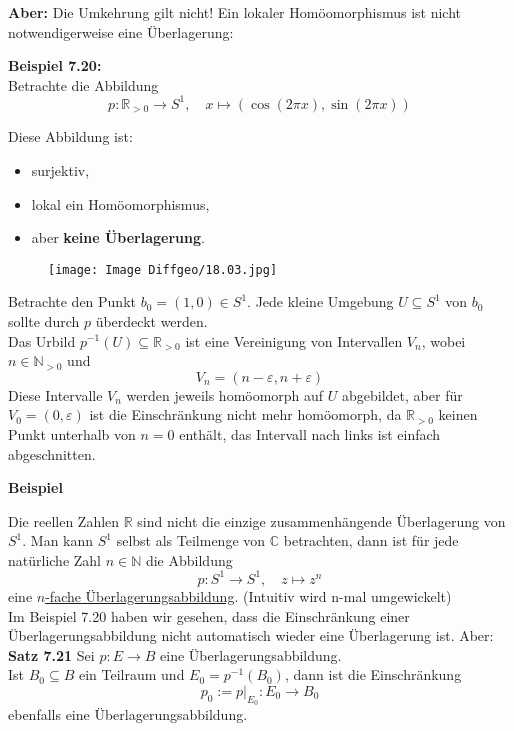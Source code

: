 \documentclass[fleqn, 12pt, letterpaper]{article}
\begin{document}
\textbf{Aber:} Die Umkehrung gilt nicht! Ein lokaler Homöomorphismus ist nicht notwendigerweise eine Überlagerung:

\vspace{1em}
\textbf{Beispiel 7.20:} \\
Betrachte die Abbildung
\[
p : \mathbb{R}_{> 0} \to S^1, \quad x \mapsto (\cos(2\pi x), \sin(2\pi x))
\]

Diese Abbildung ist:
\begin{itemize}
  \item surjektiv,
  \item lokal ein Homöomorphismus,
  \item aber \textbf{keine Überlagerung}.
\end{itemize}
  \begin{figure}[H]
    \centering
    \texttt{[image: Image Diffgeo/18.03.jpg]}
 \end{figure}
Betrachte den Punkt \( b_0 = (1, 0) \in S^1 \). Jede kleine Umgebung \( U \subseteq S^1 \) von \( b_0 \) sollte durch \( p \) überdeckt werden. \\
Das Urbild \( p^{-1}(U) \subseteq \mathbb{R}_{> 0} \) ist eine Vereinigung von Intervallen \( V_n \), wobei \( n \in \mathbb{N}_{>0} \) und
\[
V_n = (n - \varepsilon, n + \varepsilon)
\]
Diese Intervalle \( V_n \) werden jeweils homöomorph auf \( U \) abgebildet, aber für $V_0=(0,\varepsilon)$ ist die Einschränkung nicht mehr homöomorph, da $\mathbb{R}_{>0}$ keinen Punkt unterhalb von $n=0$ enthält, das Intervall nach links ist einfach abgeschnitten.

\vspace{1em}


\textbf{Beispiel}

Die reellen Zahlen \( \mathbb{R} \) sind nicht die einzige zusammenhängende Überlagerung von \( S^1 \). Man kann \( S^1 \) selbst als Teilmenge von \( \mathbb{C} \) betrachten, dann ist für jede natürliche Zahl \( n \in \mathbb{N} \) die Abbildung
\[
p : S^1 \to S^1, \quad z \mapsto z^n
\]
eine \underline{\( n \)-fache Überlagerungsabbildung}. (Intuitiv wird n-mal umgewickelt)\\

Im Beispiel 7.20 haben wir gesehen, dass die Einschränkung einer Überlagerungsabbildung nicht automatisch wieder eine Überlagerung ist. Aber:\\

\textbf{Satz 7.21}
Sei \( p : E \to B \) eine Überlagerungsabbildung. \\
Ist \( B_0 \subseteq B \) ein Teilraum und \( E_0 = p^{-1}(B_0) \), dann ist die Einschränkung
\[
p_0:=p|_{E_0} : E_0 \to B_0
\]
ebenfalls eine Überlagerungsabbildung.
\end{document}
